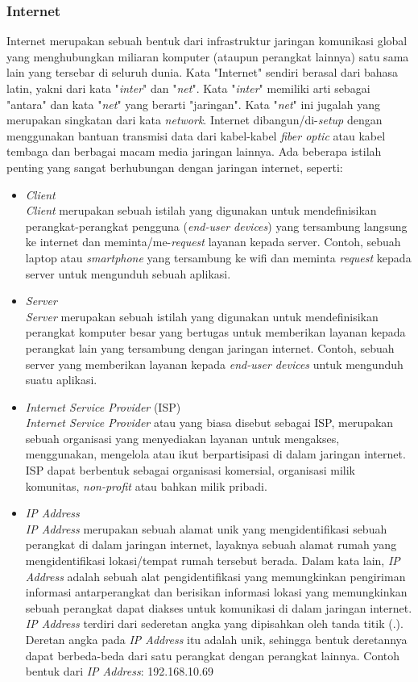 \documentclass[a4paper]{article}
\newcommand{\subsubbab}[1]{%
    \subsubsection{#1}%
}
\begin{document}
\subsubbab{Internet}
Internet merupakan sebuah bentuk dari infrastruktur jaringan komunikasi global yang menghubungkan miliaran komputer (ataupun perangkat lainnya) satu sama lain yang tersebar di seluruh dunia\autocite{javatpoint-internet}. Kata "Internet" sendiri berasal dari bahasa latin, yakni dari kata "\textit{inter}" dan "\textit{net}". Kata "\textit{inter}" memiliki arti sebagai "antara" dan kata "\textit{net}" yang berarti "jaringan". Kata "\textit{net}" ini jugalah yang merupakan singkatan dari kata \textit{network}\autocite{arti-kata-internet}. Internet dibangun/di-\textit{setup} dengan menggunakan bantuan transmisi data dari kabel-kabel \textit{fiber optic} atau kabel tembaga dan berbagai macam media jaringan lainnya\autocite{gfg-internet}. Ada beberapa istilah penting yang sangat berhubungan dengan jaringan internet, seperti:
\begin{itemize}
    \item \textit{Client}\\
    \textit{Client} merupakan sebuah istilah yang digunakan untuk mendefinisikan perangkat-perangkat pengguna (\textit{end-user devices}) yang tersambung langsung ke internet dan meminta/me-\textit{request} layanan kepada server. Contoh, sebuah laptop atau \textit{smartphone} yang tersambung ke wifi dan meminta \textit{request} kepada server untuk mengunduh sebuah aplikasi\autocite{arti-client-server}.
    \item \textit{Server}\\
    \textit{Server} merupakan sebuah istilah yang digunakan untuk mendefinisikan perangkat komputer besar yang bertugas untuk memberikan layanan kepada perangkat lain yang tersambung dengan jaringan internet. Contoh, sebuah server yang memberikan layanan kepada \textit{end-user devices} untuk mengunduh suatu aplikasi\autocite{arti-client-server}.
    \item \textit{Internet Service Provider} (ISP)\\
    \textit{Internet Service Provider} atau yang biasa disebut sebagai ISP, merupakan sebuah organisasi yang menyediakan layanan untuk mengakses, menggunakan, mengelola atau ikut berpartisipasi di dalam jaringan internet. ISP dapat berbentuk sebagai organisasi komersial, organisasi milik komunitas, \textit{non-profit} atau bahkan milik pribadi\autocite{what-is-isp}.
    \item \textit{IP Address}\\
    \textit{IP Address} merupakan sebuah alamat unik yang mengidentifikasi sebuah perangkat di dalam jaringan internet, layaknya sebuah alamat rumah yang mengidentifikasi lokasi/tempat rumah tersebut berada. Dalam kata lain, \textit{IP Address} adalah sebuah alat pengidentifikasi yang memungkinkan pengiriman informasi antarperangkat dan berisikan informasi lokasi yang memungkinkan sebuah perangkat dapat diakses untuk komunikasi di dalam jaringan internet\autocite{what-is-ip-address}. \textit{IP Address} terdiri dari sederetan angka yang dipisahkan oleh tanda titik (.). Deretan angka pada \textit{IP Address} itu adalah unik, sehingga bentuk deretannya dapat berbeda-beda dari satu perangkat dengan perangkat lainnya\autocite{javatpoint-internet}. Contoh bentuk dari \textit{IP Address}: 192.168.10.69

\end{itemize}
\end{document}
